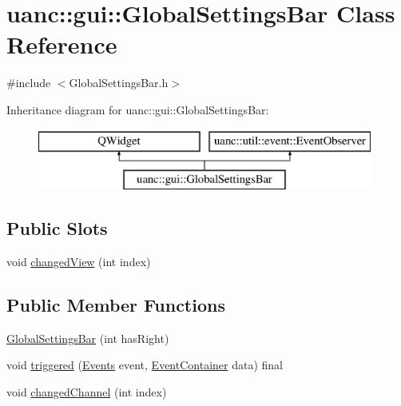 \hypertarget{classuanc_1_1gui_1_1_global_settings_bar}{}\section{uanc\+:\+:gui\+:\+:Global\+Settings\+Bar Class Reference}
\label{classuanc_1_1gui_1_1_global_settings_bar}


{\ttfamily \#include $<$Global\+Settings\+Bar.\+h$>$}

Inheritance diagram for uanc\+:\+:gui\+:\+:Global\+Settings\+Bar\+:\begin{figure}[H]
\begin{center}
\leavevmode
\includegraphics[height=2.000000cm]{classuanc_1_1gui_1_1_global_settings_bar}
\end{center}
\end{figure}
\subsection*{Public Slots}
\begin{DoxyCompactItemize}
\item 
void \hyperlink{classuanc_1_1gui_1_1_global_settings_bar_a76c5c5bac6194b489297d75544df830b}{changed\+View} (int index)
\end{DoxyCompactItemize}
\subsection*{Public Member Functions}
\begin{DoxyCompactItemize}
\item 
\hyperlink{classuanc_1_1gui_1_1_global_settings_bar_a7b4d8ddaae819768287db58572982718}{Global\+Settings\+Bar} (int has\+Right)
\item 
void \hyperlink{classuanc_1_1gui_1_1_global_settings_bar_a780fabb890235753ff90c1403638c47d}{triggered} (\hyperlink{namespaceuanc_1_1util_1_1event_a63f690675589114db9c6bcbe6f1088a4}{Events} event, \hyperlink{classuanc_1_1util_1_1event_1_1_event_container}{Event\+Container} data) final
\item 
void \hyperlink{classuanc_1_1gui_1_1_global_settings_bar_a3466ddea370d0c7e4c1ae7062092bc5a}{changed\+Channel} (int index)
\end{DoxyCompactItemize}
